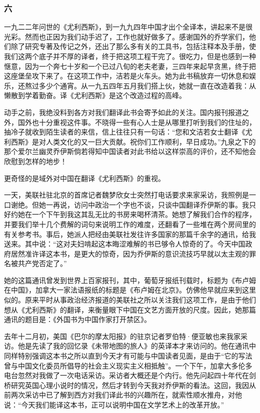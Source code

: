 \subsubsection*{六}
\par 一九二二年问世的《尤利西斯》，到一九九四年中国才出个全译本，讲起来不是很光彩。然而也正因为我们动手迟了，工作也就好做多了。感谢国外的乔学家们，他们除了研究专著及传记之外，还出了那么多有关的工具书，包括注释本及手册，使我们这两个底子并不厚的译者，终于把这项工程干完了。很吃力，但是也感到一种惬意，因为一个奔七十岁和一个已过八旬的老夫老妻，三四年来起早贪黑，终于把这座堡垒攻下来了。在这项工作中，洁若是火车头。她为此书稿放弃一切休息和娱乐，还熬过多少个通宵。从一九五四年五月我们搭上伙，她就一直在改造着我：从懒散到学着勤奋。译《尤利西斯》是这个改造过程的高峰。
\par 动手之前，我绝没料到各方对我们翻译此书会寄予如此的关注。国内报刊报道之外，国外也十分重视这件事。不晓得一些有心人士是从哪里打听到我们的住址的，抽冷子就收到陌生读者的来信，信上往往只有一句话：“您和文洁若女士翻译《尤利西斯》是对人类文化的又一巨大贡献。祝你们工作顺利，早日成功。”九泉之下的那个爱尔兰幽灵乔伊斯倘若得知中国读者对此书给以这样崇高的评价，还不知他会欣慰到怎样的地步！
\par 更奇怪的是域外对中国在翻译《尤利西斯》的重视。
\par 一天，美联社驻北京的首席记者魏梦欣女士突然打电话要求来家采访，我照例是一口谢绝。但她一再说，访问中政治一个字也不谈，只谈中国翻译乔伊斯的事。我只好约她在一个下午到我这其乱无比的书房来喝杯清茶。她想了解我们合作的程序，并要我们举十几个费解的词句来说明工作的难度，还翻看了一些堆在两个房间里的有关参考书。事后，她派人把经由美联社发往许多国家的那篇千余字的通讯，给我送来。其中说：“这对夫妇啃起这本晦涩难解的书已够令人惊奇的了。今天中国政府居然准许译这本书，是更大的惊奇，因为乔伊斯的意识流技巧早就以太主观的罪名被共产党否定了。”
\par 她的这篇通讯曾发到世界上百家报刊，其中，葡萄牙报纸刊载时，标题为《布卢姆在中国》，加拿大一家法语报纸的标题是《布卢姆在北京》。仿佛他早就应来到这里似的。原来平时从事政治经济报道的美联社之所以关注我们这项工作，是由于他们想从《尤利西斯》的翻译，来衡量眼下中国在文艺方面开放的尺度。因此，她那篇通讯的题目是：《外国书为中国作家打开禁区》。
\par 去年十二月初，美国《巴尔的摩太阳报》的驻京记者罗伯特·便亚敏也来我家采访。他是先读了我的回忆录《未带地图的旅人》的英译本才来访问的。他在通讯中同样特别强调这本书之所以直到今天才有可能与中国读者见面，是由于“它的写法曾与中国文化委员所倡导的社会主义现实主义相抵触”。一个下午，加拿大多伦多电台忽然对我做了一次电话采访。采访者大概还是个内行。他先问起四十年代在剑桥研究英国心理小说时的情况，然后才转到今天我对乔伊斯的看法。这回，我因从前两次采访中已了解到西方对我们译此书的兴趣所在，就索性顺水推舟，对他说：“今天我们能译这本书，正可以说明中国在文学艺术上的改革开放。”
